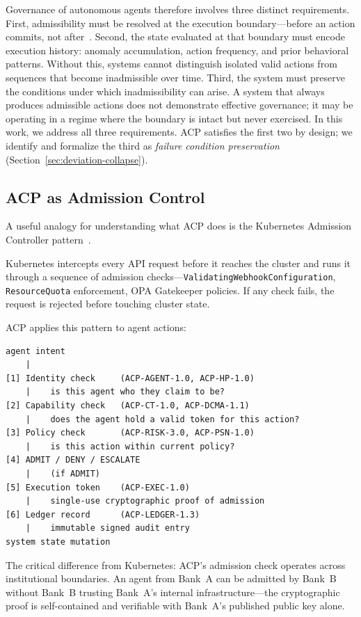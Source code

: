 \documentclass[11pt]{article}
\theoremstyle{definition}
\begin{document}
Governance of autonomous agents therefore involves three distinct requirements.
First, admissibility must be resolved at the execution boundary---before an action commits,
not after~\cite{anderson1972planning}.
Second, the state evaluated at that boundary must encode execution history:
anomaly accumulation, action frequency, and prior behavioral patterns.
Without this, systems cannot distinguish isolated valid actions from sequences that become
inadmissible over time.
Third, the system must preserve the conditions under which inadmissibility can arise.
A system that always produces admissible actions does not demonstrate effective governance;
it may be operating in a regime where the boundary is intact but never exercised.
In this work, we address all three requirements.
ACP satisfies the first two by design; we identify and formalize the third as
\emph{failure condition preservation} (Section~\ref{sec:deviation-collapse}).

\subsection{ACP as Admission Control}

A useful analogy for understanding what ACP does is the Kubernetes Admission Controller pattern~\cite{kubernetes-admission}.

Kubernetes intercepts every API request before it reaches the cluster and runs it through a sequence of admission checks---\texttt{ValidatingWebhookConfiguration},
\texttt{ResourceQuota} enforcement, OPA Gatekeeper policies.
If any check fails, the request is rejected before touching cluster state.

ACP applies this pattern to agent actions:

\begin{lstlisting}
agent intent
    |
[1] Identity check     (ACP-AGENT-1.0, ACP-HP-1.0)
    |    is this agent who they claim to be?
[2] Capability check   (ACP-CT-1.0, ACP-DCMA-1.1)
    |    does the agent hold a valid token for this action?
[3] Policy check       (ACP-RISK-3.0, ACP-PSN-1.0)
    |    is this action within current policy?
[4] ADMIT / DENY / ESCALATE
    |    (if ADMIT)
[5] Execution token    (ACP-EXEC-1.0)
    |    single-use cryptographic proof of admission
[6] Ledger record      (ACP-LEDGER-1.3)
    |    immutable signed audit entry
system state mutation
\end{lstlisting}

The critical difference from Kubernetes: ACP's admission check operates across institutional boundaries.
An agent from Bank~A can be admitted by Bank~B without Bank~B trusting Bank~A's internal infrastructure---the
cryptographic proof is self-contained and verifiable with Bank~A's published public key alone.
\end{document}
